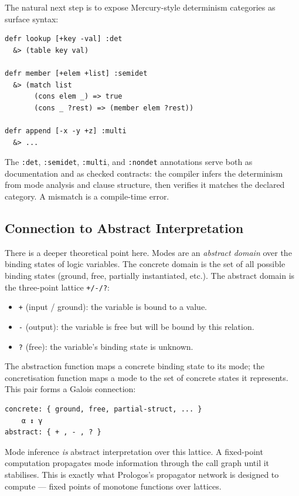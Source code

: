 \documentclass[11pt]{article}
\begin{document}
The natural next step is to expose Mercury-style determinism categories as
surface syntax:

\begin{verbatim}
defr lookup [+key -val] :det
  &> (table key val)

defr member [+elem +list] :semidet
  &> (match list
       (cons elem _) => true
       (cons _ ?rest) => (member elem ?rest))

defr append [-x -y +z] :multi
  &> ...
\end{verbatim}

The \texttt{:det}, \texttt{:semidet}, \texttt{:multi}, and \texttt{:nondet} annotations serve both as
documentation and as checked contracts: the compiler infers the determinism from
mode analysis and clause structure, then verifies it matches the declared
category. A mismatch is a compile-time error.
\subsection{Connection to Abstract Interpretation}
\label{sec:org4c0fe29}

There is a deeper theoretical point here. Modes are an \emph{abstract domain} over
the binding states of logic variables. The concrete domain is the set of all
possible binding states (ground, free, partially instantiated, etc.). The
abstract domain is the three-point lattice \texttt{+/-/?}:

\begin{itemize}
\item \texttt{+} (input / ground): the variable is bound to a value.
\item \texttt{-} (output): the variable is free but will be bound by this relation.
\item \texttt{?} (free): the variable's binding state is unknown.
\end{itemize}

The abstraction function maps a concrete binding state to its mode; the
concretisation function maps a mode to the set of concrete states it represents.
This pair forms a Galois connection:

\begin{verbatim}
concrete: { ground, free, partial-struct, ... }
    α ↕ γ
abstract: { + , - , ? }
\end{verbatim}

Mode inference \emph{is} abstract interpretation over this lattice. A fixed-point
computation propagates mode information through the call graph until it
stabilises. This is exactly what Prologos's propagator network is designed to
compute --- fixed points of monotone functions over lattices.
\end{document}
